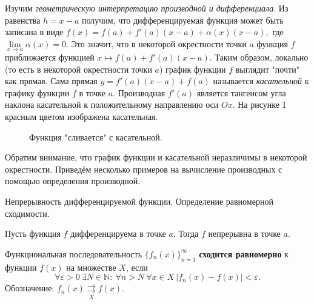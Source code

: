 Изучим
\emph{геометрическую интерпретацию производной
    и дифференциала}.
Из равенства $h=x-a$ получим, что дифференцируемая
функция может быть записана в виде $f(x)=f(a)+
    f'(a)(x-a)+\alpha(x)(x-a),$ где $\lim\limits_{
        x\rightarrow a}\alpha(x)=0.$ Это значит, что в
некоторой окрестности точки $a$ функция $f$
приближается функцией $x\mapsto f(a)+f'(a)(x-a).$
Таким образом, локально (то есть в некоторой
окрестности точки $a$) график функции $f$
выглядит "почти" как прямая. Сама прямая
$y=f'(a)(x-a)+f(a)$ называется
\emph{касательной} к графику функции $f$ в точке
$a.$ Производная $f'(a)$
является тангенсом угла наклона касательной
к положительному направлению оси $Ox.$
На рисунке 1 красным цветом изображена
касательная. \begin{figure}[h!]
    \caption{Функция "сливается" с касательной.}
    \label{fig:image}
\end{figure} Обратим внимание, что
график функции и касательной неразличимы
в некоторой окрестности.
Приведём несколько примеров на вычисление
производных с помощью определения производной.

\newpage
\begin{problem}
Непрерывность дифференцируемой функции. Определение равномерной сходимости.
\end{problem}

\begin{proposition}
    Пусть функция $f$ дифференцируема
    в точке $a.$ Тогда $f$ непрерывна в точке $a.$
\end{proposition}
\begin{definition}
    Функциональная последовательность
    $\{f_n(x)\}_{n = 1}^\infty$
    \textbf{сходится равномерно} к функции $f(x)$
    на множестве $X$, если
    $$\forall \varepsilon > 0 \ \exists N
        \in \mathbb N: \ \forall n > N \ \forall x \in X
        \ |f_n(x) - f(x)| < \varepsilon.
    $$
    Обозначение: $f_n(x) \underset{X}\rightrightarrows f(x).$
\end{definition}

